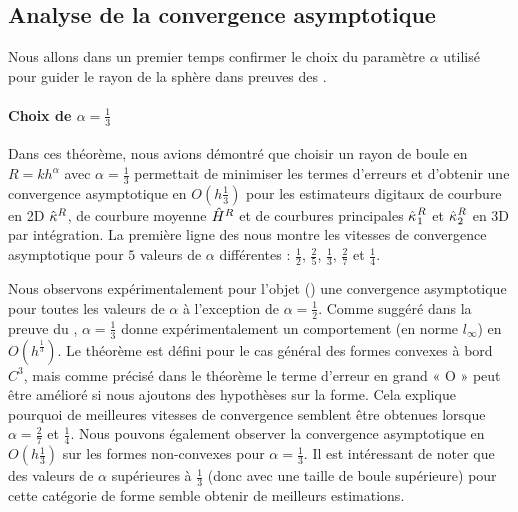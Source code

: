 \subsection{Analyse de la convergence asymptotique}
%
Nous allons dans un premier temps confirmer le choix du paramètre $\alpha$
utilisé pour guider le rayon de la sphère dans preuves des
.
%
\paragraph{Choix de $\alpha = \frac{1}{3}$}
%
Dans ces théorème, nous avions démontré que choisir un rayon de boule en $R =
kh^\alpha$ avec $\alpha = \frac{1}{3}$ permettait de minimiser les termes
d'erreurs et d'obtenir une convergence asymptotique en $O(h\frac{1}{3})$ pour
les estimateurs digitaux de courbure en 2D $\hat{\kappa}^{R}$, de courbure moyenne
$\hat{H}^{R}$ et de courbures principales $\hat{\kappa_{}}_{1}^{R}$ et
$\hat{\kappa_{}}_{2}^{R}$ en 3D par intégration. La première ligne des
nous montre les vitesses de convergence asymptotique pour $5$ valeurs de $\alpha$
différentes : $\frac{1}{2}$, $\frac{2}{5}$, $\frac{1}{3}$, $\frac{2}{7}$ et
$\frac{1}{4}$.


Nous observons expérimentalement pour l'objet \Ellipse
() une convergence asymptotique pour
toutes les valeurs de $\alpha$ à l'exception de $\alpha = \frac{1}{2}$. Comme
suggéré dans la preuve du , $\alpha =
\frac{1}{3}$ donne expérimentalement un comportement (en norme $l_\infty$) en
$O(h^\frac{1}{3})$. Le théorème est défini pour le cas général des formes
convexes à bord $C^3$, mais comme précisé dans le théorème le terme d'erreur en
grand « O » peut être amélioré si nous ajoutons des hypothèses sur la forme.
Cela explique pourquoi de meilleures vitesses de convergence semblent être
obtenues lorsque $\alpha = \frac{2}{7}$ et $\frac{1}{4}$. Nous pouvons également
observer la convergence asymptotique en $O(h\frac{1}{3})$ sur les formes
non-convexes pour $\alpha = \frac{1}{3}$. Il est intéressant de noter que des
valeurs de $\alpha$ supérieures à $\frac{1}{3}$ (donc avec une taille de boule
supérieure) pour cette catégorie de forme semble obtenir de meilleurs
estimations.



